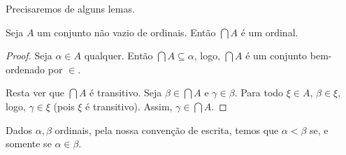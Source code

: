 Precisaremos de alguns lemas.

\begin{lemma}[$\BST$]\label{lem:intersecaoNaoVaziaDeOrdinaisEhOrdinal}
    Seja $A$ um conjunto não vazio de ordinais.
    Então $\bigcap A$ é um ordinal.
\end{lemma}
\begin{proof}
    Seja $\alpha\in A$ qualquer.
    Então $\bigcap A\subseteq \alpha$, logo, $\bigcap A$ é um conjunto bem-ordenado por $\in$.

    Resta ver que $\bigcap A$ é transitivo.
    Seja $\beta \in \bigcap A$ e $\gamma \in \beta$.
    Para todo $\xi \in A$, $\beta \in \xi$, logo, $\gamma \in \xi$ (pois $\xi$ é transitivo).
    Assim, $\gamma \in \bigcap A$.
\end{proof}

Dados $\alpha, \beta$ ordinais, pela nossa convenção de escrita, temos que $\alpha<\beta$ se, e somente se $\alpha\in \beta$.

